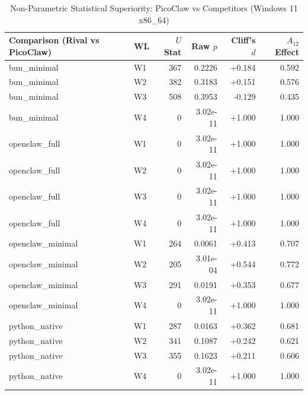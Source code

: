 \begin{table}[t]
\centering\small
\caption{Non-Parametric Statistical Superiority: PicoClaw vs Competitors (Windows 11 x86_64)}
\label{tab:Windows_stat_tests}
\begin{tabular}{llrrrr}
\toprule
Comparison (Rival vs PicoClaw) & WL & $U$ Stat & Raw $p$ & Cliff's $d$ & $A_{12}$ Effect \\
\midrule
bun\_minimal & W1 & 367 & 0.2226 & +0.184 & 0.592 \\
bun\_minimal & W2 & 382 & 0.3183 & +0.151 & 0.576 \\
bun\_minimal & W3 & 508 & 0.3953 & -0.129 & 0.435 \\
bun\_minimal & W4 & 0 & 3.02e-11 & +1.000 & 1.000 \\
openclaw\_full & W1 & 0 & 3.02e-11 & +1.000 & 1.000 \\
openclaw\_full & W2 & 0 & 3.02e-11 & +1.000 & 1.000 \\
openclaw\_full & W3 & 0 & 3.02e-11 & +1.000 & 1.000 \\
openclaw\_full & W4 & 0 & 3.02e-11 & +1.000 & 1.000 \\
openclaw\_minimal & W1 & 264 & 0.0061 & +0.413 & 0.707 \\
openclaw\_minimal & W2 & 205 & 3.01e-04 & +0.544 & 0.772 \\
openclaw\_minimal & W3 & 291 & 0.0191 & +0.353 & 0.677 \\
openclaw\_minimal & W4 & 0 & 3.02e-11 & +1.000 & 1.000 \\
python\_native & W1 & 287 & 0.0163 & +0.362 & 0.681 \\
python\_native & W2 & 341 & 0.1087 & +0.242 & 0.621 \\
python\_native & W3 & 355 & 0.1623 & +0.211 & 0.606 \\
python\_native & W4 & 0 & 3.02e-11 & +1.000 & 1.000 \\
\bottomrule
\end{tabular}
\end{table}
